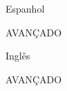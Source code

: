 

\begin{cventries}

  \cventry
    {} %
    {Espanhol} %
    {} %
    {} %
    {
      \begin{cvitems} %
        \item{AVANÇADO}
      \end{cvitems}
    }

  \cventry
    {} %
    {Inglês} %
    {} %
    {} %
    {
      \begin{cvitems} %
        \item{AVANÇADO}
      \end{cvitems}
    }

\end{cventries}
